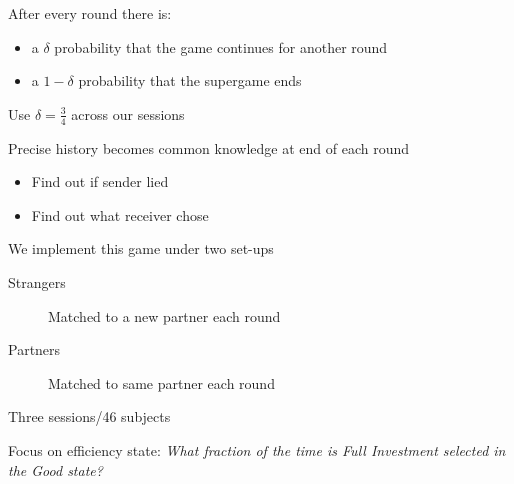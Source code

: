 \documentclass{beamer}
\begin{document}
\begin{frame}
\begin{card}[Repetition]
  After every round there is:     
   \begin{itemize}
                \item a $\delta$ probability that the game continues for another round
                \item a $1-\delta$ probability that the supergame ends
            \end{itemize}
     Use $\delta=\tfrac{3}{4}$ across our sessions
\end{card}
    \begin{card}
     Precise history becomes common knowledge at end of each round
        \begin{itemize}
            \item Find out if sender lied
            \item Find out what receiver chose
        \end{itemize}
    \end{card}
\end{frame}

\begin{frame}
\begin{card}
   We implement this game under two set-ups    
   \begin{description}
                \item[Strangers] Matched to a new partner each round
                \item[Partners] Matched to same partner each round
  \end{description}
  Three sessions/46 subjects
\end{card}
\begin{card}
   Focus on efficiency state: \emph{What fraction of the time is Full Investment selected in the Good state?}
\end{card}
\end{frame}
\end{document}

